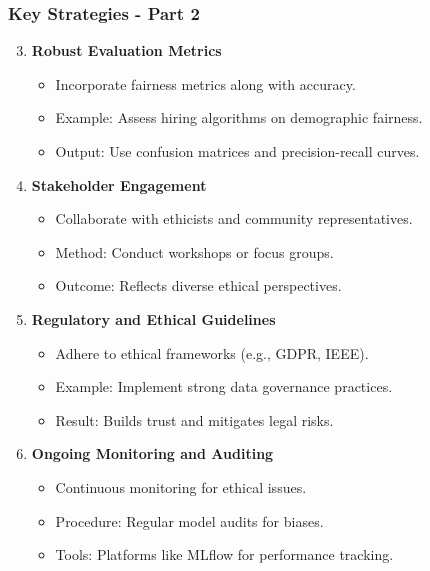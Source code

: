 \documentclass{beamer}
\begin{document}
\begin{frame}[fragile]
    \frametitle{Key Strategies - Part 2}
    \begin{enumerate}\setcounter{enumi}{2}
        \item \textbf{Robust Evaluation Metrics}
        \begin{itemize}
            \item Incorporate fairness metrics along with accuracy.
            \item Example: Assess hiring algorithms on demographic fairness.
            \item Output: Use confusion matrices and precision-recall curves.
        \end{itemize}

        \item \textbf{Stakeholder Engagement}
        \begin{itemize}
            \item Collaborate with ethicists and community representatives.
            \item Method: Conduct workshops or focus groups.
            \item Outcome: Reflects diverse ethical perspectives.
        \end{itemize}

        \item \textbf{Regulatory and Ethical Guidelines}
        \begin{itemize}
            \item Adhere to ethical frameworks (e.g., GDPR, IEEE).
            \item Example: Implement strong data governance practices.
            \item Result: Builds trust and mitigates legal risks.
        \end{itemize}
        
        \item \textbf{Ongoing Monitoring and Auditing}
        \begin{itemize}
            \item Continuous monitoring for ethical issues.
            \item Procedure: Regular model audits for biases.
            \item Tools: Platforms like MLflow for performance tracking.
        \end{itemize}
    \end{enumerate}
\end{frame}
\end{document}

